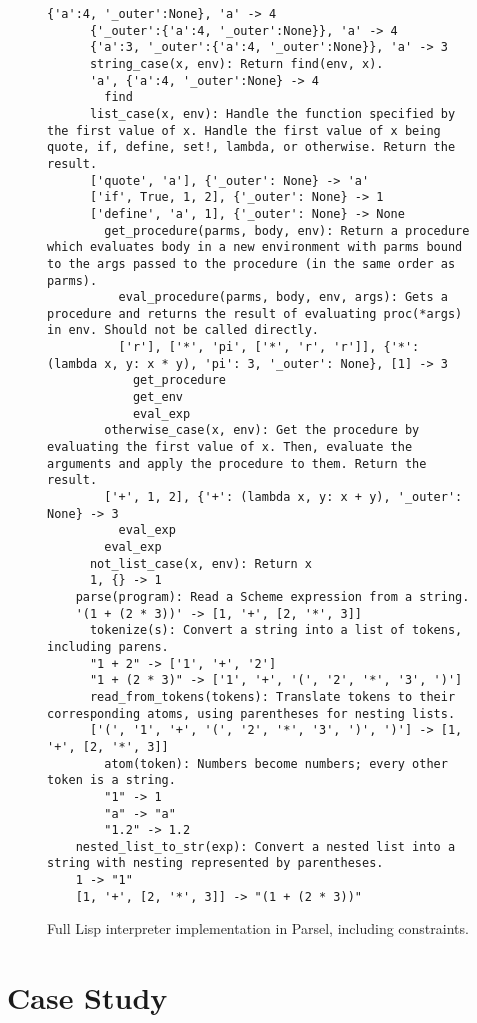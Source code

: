 \begin{figure*}
\begin{lstlisting}[basicstyle=\fontsize{6}{8}\selectfont\ttfamily]
      {'a':4, '_outer':None}, 'a' -> 4
      {'_outer':{'a':4, '_outer':None}}, 'a' -> 4
      {'a':3, '_outer':{'a':4, '_outer':None}}, 'a' -> 3
      string_case(x, env): Return find(env, x).
      'a', {'a':4, '_outer':None} -> 4
        find
      list_case(x, env): Handle the function specified by the first value of x. Handle the first value of x being quote, if, define, set!, lambda, or otherwise. Return the result.
      ['quote', 'a'], {'_outer': None} -> 'a'
      ['if', True, 1, 2], {'_outer': None} -> 1
      ['define', 'a', 1], {'_outer': None} -> None
        get_procedure(parms, body, env): Return a procedure which evaluates body in a new environment with parms bound to the args passed to the procedure (in the same order as parms).
          eval_procedure(parms, body, env, args): Gets a procedure and returns the result of evaluating proc(*args) in env. Should not be called directly.
          ['r'], ['*', 'pi', ['*', 'r', 'r']], {'*': (lambda x, y: x * y), 'pi': 3, '_outer': None}, [1] -> 3
            get_procedure
            get_env
            eval_exp
        otherwise_case(x, env): Get the procedure by evaluating the first value of x. Then, evaluate the arguments and apply the procedure to them. Return the result.
        ['+', 1, 2], {'+': (lambda x, y: x + y), '_outer': None} -> 3
          eval_exp
        eval_exp
      not_list_case(x, env): Return x
      1, {} -> 1
    parse(program): Read a Scheme expression from a string.
    '(1 + (2 * 3))' -> [1, '+', [2, '*', 3]]
      tokenize(s): Convert a string into a list of tokens, including parens.
      "1 + 2" -> ['1', '+', '2']
      "1 + (2 * 3)" -> ['1', '+', '(', '2', '*', '3', ')']
      read_from_tokens(tokens): Translate tokens to their corresponding atoms, using parentheses for nesting lists.
      ['(', '1', '+', '(', '2', '*', '3', ')', ')'] -> [1, '+', [2, '*', 3]]
        atom(token): Numbers become numbers; every other token is a string.
        "1" -> 1
        "a" -> "a"
        "1.2" -> 1.2
    nested_list_to_str(exp): Convert a nested list into a string with nesting represented by parentheses.
    1 -> "1"
    [1, '+', [2, '*', 3]] -> "(1 + (2 * 3))"
\end{lstlisting}
\caption{Full Lisp interpreter implementation in Parsel, including constraints.}
\label{fig:lispinterpreter}
\end{figure*}

\clearpage
\newpage

\section{Case Study}


